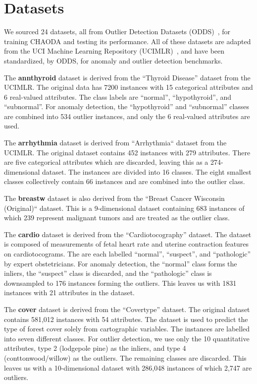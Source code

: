 \section{Datasets}
\label{sec:datasets}

We sourced 24 datasets, all from Outlier Detection Datasets (ODDS)~\cite{rayana2016odds}, for training CHAODA and testing its performance.
All of these datasets are adapted from the UCI Machine Learning Repository (UCIMLR)~\cite{UCIMLR}, and have been standardized, by ODDS, for anomaly and outlier detection benchmarks.

The \textbf{annthyroid} dataset is derived from the ``Thyroid Disease'' dataset from the UCIMLR\@.
The original data has 7200 instances with 15 categorical attributes and 6 real-valued attributes.
The class labels are ``normal'', ``hypothyroid'', and ``subnormal''.
For anomaly detection, the ``hypothyroid'' and ``subnormal'' classes are combined into 534 outlier instances, and only the 6 real-valued attributes are used.

The \textbf{arrhythmia} dataset is derived from ``Arrhythmia`` dataset from the UCIMLR\@.
The original dataset contains 452 instances with 279 attributes.
There are five categorical attributes which are discarded, leaving this as a 274-dimensional dataset.
The instances are divided into 16 classes.
The eight smallest classes collectively contain 66 instances and are combined into the outlier class.

The \textbf{breastw} dataset is also derived from the ``Breast Cancer Wisconsin (Original)`` dataset.
This is a 9-dimensional dataset containing 683 instances of which 239 represent malignant tumors and are treated as the outlier class.

The \textbf{cardio} dataset is derived from the ``Cardiotocography'' dataset.
The dataset is composed of measurements of fetal heart rate and uterine contraction features on cardiotocograms.
The are each labelled ``normal'', ``suspect'', and ``pathologic'' by expert obstetricians.
For anomaly detection, the ``normal'' class forms the inliers, the ``suspect'' class is discarded, and the ``pathologic'' class is downsampled to 176 instances forming the outliers.
This leaves us with 1831 instances with 21 attributes in the dataset.

The \textbf{cover} dataset is derived from the ``Covertype'' dataset.
The original dataset contains 581,012 instances with 54 attributes.
The dataset is used to predict the type of forest cover solely from cartographic variables.
The instances are labelled into seven different classes.
For outlier detection, we use only the 10 quantitative attributes, type 2 (lodgepole pine) as the inliers, and type 4 (conttonwood/willow) as the outliers.
The remaining classes are discarded.
This leaves us with a 10-dimensional dataset with 286,048 instances of which 2,747 are outliers.

